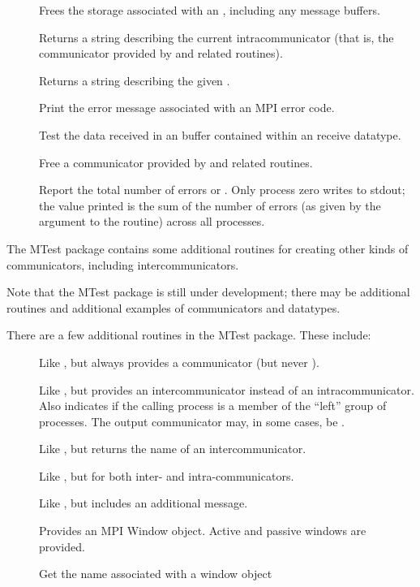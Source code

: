 \begin{description}
\item[]Frees the storage associated with an
    , including any message buffers.

\item[]Returns a string describing the
current intracommunicator (that is, the communicator provided by
 and related routines).

\item[]Returns a string describing the
given .

\item[]Print the error message associated with
an MPI error code.

\item[]Test the data received in an buffer
contained within an  receive datatype.

\item[]Free a communicator provided by
 and related routines.

\item[]Report the total number of errors or
.  Only process zero writes to stdout; the value
printed is the sum of the number of errors (as given by the argument
to the routine) across all processes.
\end{description}

The MTest package contains some additional routines for creating other
kinds of communicators, including intercommunicators.

Note that the MTest package is still under development; there may be
additional routines and additional examples of communicators and
datatypes.  

There are a few additional routines in the MTest package.  These include:
\begin{description}
\item[]Like ,
but always provides a communicator (but never ).
\item[]Like , but
provides an intercommunicator instead of an intracommunicator.  Also
indicates if the calling process is a member of the ``left'' group of
processes.  The output communicator may, in some cases, be
.  
\item[]Like ,
but returns the name of an intercommunicator.
\item[]Like , but for both
inter- and intra-communicators.
\item[]Like , but
includes an additional message.
\item[]Provides an MPI Window object.  Active and
passive windows are provided.  
\item[]Get the name associated with a window object
\end{description}

